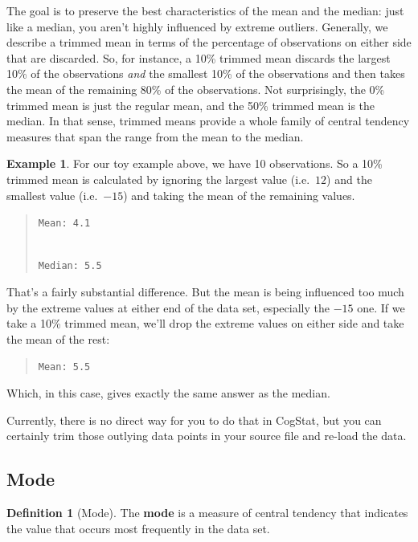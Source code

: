 \documentclass[
  11pt,
]{book}
\theoremstyle{definition}
\newtheorem{definition}{Definition}[chapter]
\theoremstyle{definition}
\newtheorem{example}{Example}[chapter]
\theoremstyle{definition}
\theoremstyle{definition}
\theoremstyle{remark}
\begin{document}
The goal is to preserve the best characteristics of the mean and the median: just like a median, you aren't highly influenced by extreme outliers. Generally, we describe a trimmed mean in terms of the percentage of observations on either side that are discarded. So, for instance, a 10\% trimmed mean discards the largest 10\% of the observations \emph{and} the smallest 10\% of the observations and then takes the mean of the remaining 80\% of the observations. Not surprisingly, the 0\% trimmed mean is just the regular mean, and the 50\% trimmed mean is the median. In that sense, trimmed means provide a whole family of central tendency measures that span the range from the mean to the median.

\begin{example}
\protect\hypertarget{exm:extrimmedmean}{}\label{exm:extrimmedmean}For our toy example above, we have 10 observations. So a 10\% trimmed mean is calculated by ignoring the largest value (i.e.~\(12\)) and the smallest value (i.e.~\(-15\)) and taking the mean of the remaining values.

\begin{quote}
\texttt{Mean:\ 4.1}\strut \\
\texttt{Median:\ 5.5}
\end{quote}

That's a fairly substantial difference. But the mean is being influenced too much by the extreme values at either end of the data set, especially the \(-15\) one. If we take a 10\% trimmed mean, we'll drop the extreme values on either side and take the mean of the rest:

\begin{quote}
\texttt{Mean:\ 5.5}
\end{quote}

Which, in this case, gives exactly the same answer as the median.
\end{example}

Currently, there is no direct way for you to do that in CogStat, but you can certainly trim those outlying data points in your source file and re-load the data.

\hypertarget{mode}{%
\subsection{Mode}\label{mode}}

\begin{definition}[Mode]
\protect\hypertarget{def:defmode}{}\label{def:defmode}The \textbf{mode} is a measure of central tendency that indicates the value that occurs most frequently in the data set.
\end{definition}
\end{document}
